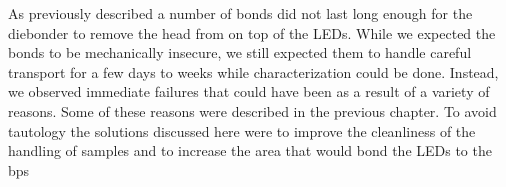 As previously described a number of bonds did not last long enough for the diebonder to remove the head from on top of the LEDs. While we expected the bonds to be mechanically insecure, we still expected them to handle careful transport for a few days to weeks while characterization could be done. Instead, we observed immediate failures that could have been as a result of a variety of reasons. Some of these reasons were described in the previous chapter. To avoid tautology the solutions discussed here were to improve the cleanliness of the handling of samples and to increase the area that would bond the LEDs to the bps



